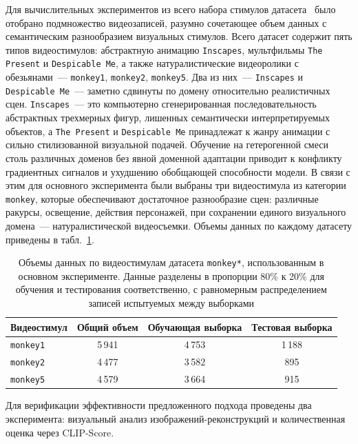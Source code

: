 Для вычислительных экспериментов из всего набора стимулов датасета~\cite{Telesford2023} было отобрано подмножество видеозаписей, разумно сочетающее объем данных с семантическим разнообразием визуальных стимулов. Всего датасет содержит пять типов видеостимулов: абстрактную анимацию \texttt{Inscapes}, мультфильмы \texttt{The Present} и \texttt{Despicable Me}, а также натуралистические видеоролики с обезьянами~--- \texttt{monkey1}, \texttt{monkey2}, \texttt{monkey5}. Два из них~--- \texttt{Inscapes} и \texttt{Despicable Me}~--- заметно сдвинуты по домену относительно реалистичных сцен. \texttt{Inscapes}~--- это компьютерно сгенерированная последовательность абстрактных трехмерных фигур, лишенных семантически интерпретируемых объектов, а \texttt{The Present} и \texttt{Despicable Me} принадлежат к жанру анимации с сильно стилизованной визуальной подачей. Обучение на гетерогенной смеси столь различных доменов без явной доменной адаптации приводит к конфликту градиентных сигналов и ухудшению обобщающей способности модели. В связи с этим для основного эксперимента были выбраны три видеостимула из категории \texttt{monkey}, которые обеспечивают достаточное разнообразие сцен: различные ракурсы, освещение, действия персонажей, при сохранении единого визуального домена~--- натуралистической видеосъемки. Объемы данных по каждому датасету приведены в табл.~\ref{tab:monkey_dataset}.

\begin{table}[h!]
    \centering
    \caption{Объемы данных по видеостимулам датасета \texttt{monkey*}, использованным в основном эксперименте. Данные разделены в пропорции 80\% к 20\% для обучения и тестирования соответственно, с равномерным распределением записей испытуемых между выборками}
    \label{tab:monkey_dataset}
    \begin{tabular}{lccc}
        \toprule
        Видеостимул & Общий объем & Обучающая выборка & Тестовая выборка \\
        \midrule
        \texttt{monkey1} & 5\,941 &  4\,753 & 1\,188 \\
        \texttt{monkey2} & 4\,477 & 3\,582 & 895 \\
        \texttt{monkey5} & 4\,579 & 3\,664 & 915 \\
        \bottomrule
    \end{tabular}
\end{table}

Для верификации эффективности предложенного подхода проведены два эксперимента: визуальный анализ изображений-реконструкций и количественная оценка через CLIP-Score.

